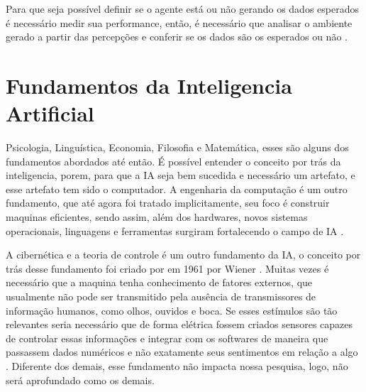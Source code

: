 Para que seja possível definir se o agente está ou não gerando os dados esperados é necessário medir sua performance, então, é necessário que analisar o ambiente gerado a partir das percepções e conferir se os dados são os esperados ou não \cite[294-295]{frege1956thought}.

\section{Fundamentos da Inteligencia Artificial}

Psicologia, Linguística, Economia, Filosofia e Matemática, esses são alguns dos fundamentos abordados até então. É possível entender o conceito por trás da inteligencia, porem, para que a IA seja bem sucedida e necessário um artefato, e esse artefato tem sido o computador. A engenharia da computação é um outro fundamento, que até agora foi tratado implicitamente, seu foco é construir maquinas eficientes, sendo assim, além dos hardwares, novos sistemas operacionais, linguagens e ferramentas surgiram fortalecendo o campo de IA \cite[13-14]{russell2003artificial}.

A cibernética e a teoria de controle é um outro fundamento da IA, o conceito por trás desse fundamento foi criado por em 1961 por Wiener \cite[15]{russell2003artificial}. Muitas vezes é necessário que a maquina tenha conhecimento de fatores externos, que usualmente não pode ser transmitido pela ausência de transmissores de informação humanos, como olhos, ouvidos e boca. Se esses estímulos são tão relevantes seria necessário que de forma elétrica fossem criados sensores capazes de controlar essas informações e integrar com os softwares de maneira que passassem dados numéricos e não exatamente seus sentimentos em relação a algo \cite[3-7]{wiener1961cybernetics}. Diferente dos demais, esse fundamento não impacta nossa pesquisa, logo, não será aprofundado como os demais.

